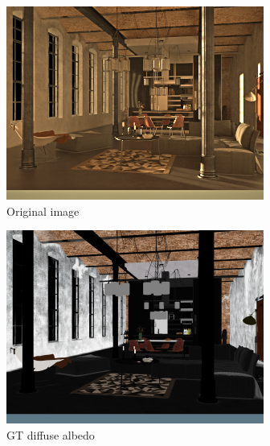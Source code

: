 \begin{figure}
  \centering
  \begin{subfigure}{0.32\linewidth}
    \includegraphics[width=\linewidth]{praca/images/AI46_009_Cam01.VRayLightSelect_RE_L0.png}
    \caption{Original image}
  \end{subfigure}
  \begin{subfigure}{0.32\linewidth}
    \includegraphics[width=\linewidth]{praca/images/AI46_009_Cam01.VRayLightSelect_RE_L0.albedo.png}
    \caption{GT diffuse albedo}
  \end{subfigure}
  \begin{subfigure}{0.32\linewidth}

\end{subfigure}
\end{figure}

